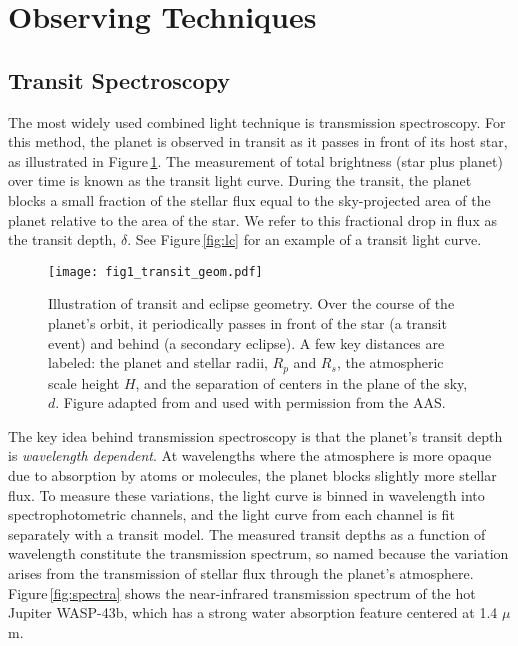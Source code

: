 \documentclass[graybox,natbib,nosecnum]{svmult}
\begin{document}

\section{Observing Techniques} 

\subsection{Transit Spectroscopy}
The most widely used combined light technique is transmission spectroscopy. For this method, the planet is observed in transit as it passes in front of its host star, as illustrated in Figure\,\ref{fig:geom}.  The measurement of total brightness (star plus planet) over time is known as the transit light curve.  During the transit, the planet blocks a small fraction of the stellar flux equal to the sky-projected area of the planet relative to the area of the star. We refer to this fractional drop in flux as the transit depth, $\delta$. See Figure\,\ref{fig:lc} for an example of a transit light curve.

\begin{figure}
\begin{centering}
\texttt{[image: fig1\_transit\_geom.pdf]}
\caption{Illustration of transit and eclipse geometry. Over the course of the planet's orbit, it periodically passes in front of the star (a transit event) and behind (a secondary eclipse). A few key distances are labeled: the planet and stellar radii, $R_p$ and $R_s$, the atmospheric scale height $H$, and the separation of centers in the plane of the sky, $d$. Figure adapted from \citealt{robinson17} and used with permission from the AAS.}
\label{fig:geom}       
\end{centering}
\end{figure}

The key idea behind transmission spectroscopy is that the planet's transit depth is \emph{wavelength dependent}.  At wavelengths where the atmosphere is more opaque due to absorption by atoms or molecules, the planet blocks slightly more stellar flux.  To measure these variations, the light curve is binned in wavelength into spectrophotometric channels, and the light curve from each channel is fit separately with a transit model.  The measured transit depths as a function of wavelength constitute the transmission spectrum, so named because the variation arises from the transmission of stellar flux through the planet's atmosphere. Figure\,\ref{fig:spectra} shows the near-infrared transmission spectrum of the hot Jupiter WASP-43b, which has a strong water absorption feature centered at 1.4 $\mu$m. 
 
\end{document}
